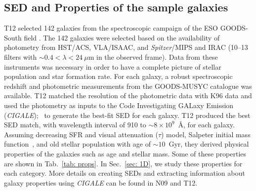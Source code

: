  \subsection{SED and Properties of the sample galaxies} 
    T12 selected 142 galaxies from the spectroscopic campaign of the ESO GOODS-South field \citep{}. %
    The 142 galaxies were selected based on the availability of photometry from HST/ACS, VLA/ISAAC, and {\it Spitzer}/MIPS and IRAC (10--13 filters with $\sim 0.4<\lambda<24~\mu$m in the observed frame).
   Data from these instruments was necessary in order to have a complete picture of stellar population and star formation rate. 
    For each galaxy, a robust spectroscopic redshift and photometric measurements from the GOODS-MUSYC catalogue \citep{} was available. %
   T12 matched the resolution of the photometric data with K96 data %
and used the photometry as inputs to the Code Investigating GALaxy Emission ({\em CIGALE});~\citep[][hereafter N09]{Noll09} to generate the best-fit SED for each galaxy.%
    T12 produced the best SED match, with wavelength interval of 910 to $\sim 8\times10^9$~\AA, for each galaxy. %
    Assuming decreasing SFR and visual attenuation ($\tau$) model, Salpeter initial mass function~\citep{Salpeter55}, and old stellar population with age of $\sim 10$~Gyr, they derived physical properties of the galaxies such as age and stellar mass.
    Some of these properties are shown in Tab.~\ref{tab: props}.
    In Sec.~\ref{sec: 1D}, we study these properties for each category.
    More details on creating SEDs and extracting information about galaxy properties using {\em CIGALE} can be found in N09 and T12.
    
